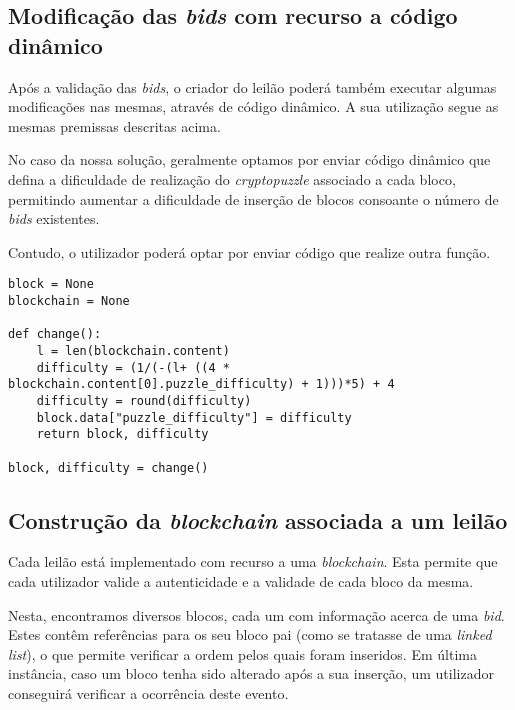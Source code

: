 \documentclass[12pt]{article}
\begin{document}
\subsection{Modificação das \textit{bids} com recurso a código dinâmico}

\par Após a validação das \textit{bids}, o criador do leilão poderá também executar algumas modificações nas mesmas, através de código dinâmico. A sua utilização segue as mesmas premissas descritas acima.

\par No caso da nossa solução, geralmente optamos por enviar código dinâmico que defina a dificuldade de realização do \textit{cryptopuzzle} associado a cada bloco, permitindo aumentar a dificuldade de inserção de blocos consoante o número de \textit{bids} existentes. 

\par Contudo, o utilizador poderá optar por enviar código que realize outra função.

\vspace{5mm} %

\begin{lstlisting}[caption={Exemplo de uma Função de Modificação Dinâmica},captionpos=b]
block = None
blockchain = None

def change():
	l = len(blockchain.content)
	difficulty = (1/(-(l+ ((4 * blockchain.content[0].puzzle_difficulty) + 1)))*5) + 4
	difficulty = round(difficulty)
	block.data["puzzle_difficulty"] = difficulty
	return block, difficulty

block, difficulty = change()
\end{lstlisting}







\subsection{Construção da \textit{blockchain} associada a um leilão}

\par Cada leilão está implementado com recurso a uma \textit{blockchain}. Esta permite que cada utilizador valide a autenticidade e a validade de cada bloco da mesma. 

\par Nesta, encontramos diversos blocos, cada um com informação acerca de uma \textit{bid}. Estes contêm referências para os seu bloco pai (como se tratasse de uma \textit{linked list}), o que permite verificar a ordem pelos quais foram inseridos. Em última instância, caso um bloco tenha sido alterado após a sua inserção, um utilizador conseguirá verificar a ocorrência deste evento.
\end{document}
